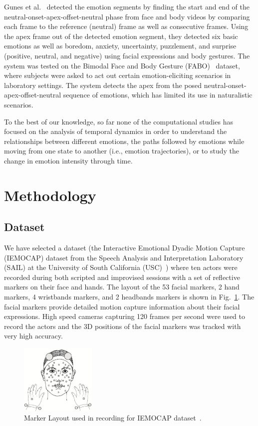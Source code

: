 \documentclass[10pt,journal,cspaper,compsoc]{IEEEtran}
\begin{document}
Gunes et al.~\cite{gunes2009automatic} detected the emotion segments by finding the start and end of the neutral-onset-apex-offset-neutral phase from face and body videos by comparing each frame to the reference (neutral) frame as well as consecutive frames. Using the apex frame out of the detected emotion segment, they detected six basic emotions as well as boredom, anxiety, uncertainty, puzzlement, and surprise (positive, neutral, and negative) using facial expressions and body gestures. The system was tested on the Bimodal Face and Body Gesture (FABO)~\cite{gunes2006bimodal} dataset, where subjects were asked to act out certain emotion-eliciting scenarios in laboratory settings. The system detects the apex from the posed neutral-onset-apex-offset-neutral sequence of emotions, which has limited its use in naturalistic scenarios.

To the best of our knowledge, so far none of the computational studies has focused on the analysis of temporal dynamics in order to understand the relationships between different emotions, the paths followed by emotions while moving from one state to another (i.e., emotion trajectories), or to study the change in emotion intensity through time.
\section{Methodology}
\label{sec_methodology}
\subsection{Dataset}
\label{sec_dataset}
We have selected a dataset (the Interactive Emotional Dyadic Motion Capture (IEMOCAP) dataset from the Speech Analysis and Interpretation Laboratory (SAIL) at the University of South California (USC)~\cite{Busso08}) where ten actors were recorded during both scripted and improvised sessions with a set of reflective markers on their face and hands. The layout of the 53 facial markers, 2 hand markers, 4 wristbands markers, and 2 headbands markers is shown in Fig.~\ref{fig_marker_layout}. The facial markers provide detailed motion capture information about their facial expressions. High speed cameras capturing 120 frames per second were used to record the actors and the 3D positions of the facial markers was tracked with very high accuracy. 

\begin{figure}[!]
\centering
\includegraphics[width=0.32\textwidth]{figures/Ch4/IEMOCAP_marker_positions.jpg}
\caption{Marker Layout used in recording for IEMOCAP dataset~\cite{Busso08}.}
\label{fig_marker_layout}
\end{figure}
\end{document}
